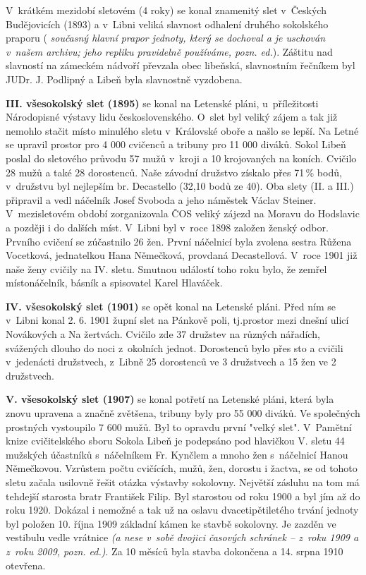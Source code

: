 \documentclass[a5paper, 12pt, twoside]{article}
\newcommand{\pozned}[1]{%
\textit{#1}}
\begin{document}
V~krátkém mezidobí sletovém (4 roky) se konal znamenitý slet v~Českých Budějovicích (1893) a v~Libni veliká slavnost odhalení druhého sokolského praporu (\pozned{současný hlavní prapor jednoty, který se dochoval a je uschován v~našem archivu; jeho repliku pravidelně používáme, pozn. ed.}). Záštitu nad slavností na zámeckém nádvoří převzala obec libeňská, slavnostním řečníkem byl JUDr. J. Podlipný a Libeň byla slavnostně vyzdobena.


\textbf{III. všesokolský slet (1895)} se konal na Letenské pláni, u~příležitosti Národopisné výstavy lidu československého. O~slet byl veliký zájem a tak již nemohlo stačit místo minulého sletu v~Královské oboře a našlo se lepší. Na Letné se upravil prostor pro 4 000 cvičenců a tribuny pro 11 000 diváků. Sokol Libeň poslal do sletového průvodu 57 mužů v~kroji a 10 krojovaných na koních. Cvičilo 28 mužů a také 28 dorostenců. Naše závodní družstvo získalo přes 71\,\% bodů, v~družstvu byl nejlepším br. Decastello (32,10 bodů ze 40). Oba slety (II. a III.) připravil a vedl náčelník Josef Svoboda a jeho náměstek Václav Steiner. V~mezisletovém období zorganizovala ČOS veliký zájezd na Moravu do Hodslavic a později i do dalších míst. V~Libni byl v~roce 1898 založen ženský odbor. Prvního cvičení se zúčastnilo 26 žen. První náčelnicí byla zvolena sestra Růžena Vocetková, jednatelkou Hana Němečková, provdaná Decastellová. V~roce 1901 již naše ženy cvičily na IV. sletu. Smutnou událostí toho roku bylo, že zemřel místonáčelník, básník a spisovatel Karel Hlaváček.


\textbf{IV. všesokolský slet (1901)} se opět konal na Letenské pláni. Před ním se v~Libni konal 2. 6. 1901 župní slet na Pánkově poli, tj.prostor mezi dnešní ulicí Novákových a Na žertvách. Cvičilo zde 37 družstev na různých nářadích, svážených dlouho do noci z~okolních jednot. Dorostenců bylo přes sto a cvičili v~jedenácti družstvech, z~Libně 25 dorostenců ve 3 družstvech a 15 žen ve 2 družstvech.


\textbf{V. všesokolský slet (1907)} se konal potřetí na Letenské pláni, která byla znovu upravena a značně zvětšena, tribuny byly pro 55 000 diváků. Ve společných prostných vystoupilo 7 600 mužů. Byl to opravdu první "velký slet". V~Pamětní knize cvičitelského sboru Sokola Libeň je podepsáno pod hlavičkou V. sletu 44 mužských účastníků s~náčelníkem Fr. Kynčlem a mnoho žen s~náčelnicí Hanou Němečkovou. Vzrůstem počtu cvičících, mužů, žen, dorostu i žactva, se od tohoto sletu začala usilovně řešit otázka výstavby sokolovny. Největší zásluhu na tom má tehdejší starosta bratr František Filip. Byl starostou od roku 1900 a byl jím až do roku 1920. Dokázal i nemožné a tak už na oslavu dvacetipětiletého trvání jednoty byl položen 10. října 1909 základní kámen ke stavbě sokolovny. Je zazděn ve vestibulu vedle vrátnice \pozned{(a nese v~sobě dvojici časových schránek – z~roku 1909 a z~roku 2009, pozn. ed.)}. Za 10 měsíců byla stavba dokončena a 14. srpna 1910 otevřena.
\end{document}
